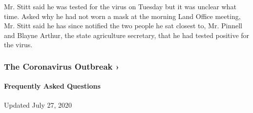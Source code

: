 Mr. Stitt said he was tested for the virus on Tuesday but it was unclear
what time. Asked why he had not worn a mask at the morning Land Office
meeting, Mr. Stitt said he has since notified the two people he sat
closest to, Mr. Pinnell and Blayne Arthur, the state agriculture
secretary, that he had tested positive for the virus.

\href{https://www.nytimes.com/news-event/coronavirus?action=click\&pgtype=Article\&state=default\&region=MAIN_CONTENT_3\&context=storylines_faq}{}

\hypertarget{the-coronavirus-outbreak-}{%
\subsubsection{The Coronavirus Outbreak
›}\label{the-coronavirus-outbreak-}}

\hypertarget{frequently-asked-questions}{%
\paragraph{Frequently Asked
Questions}\label{frequently-asked-questions}}

Updated July 27, 2020


